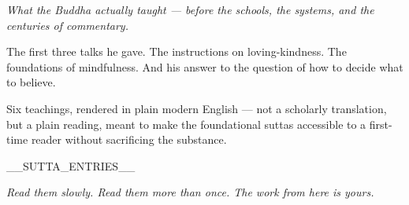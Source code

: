 \documentclass[__FONTSIZE__]{article}
\newcommand{\dividerrule}{\par\vspace{0.85em}{\color{saffron}\rule{3.2em}{1.1pt}}\par\vspace{0.85em}}
\newcommand{\suttaentry}[2]{%
  {\large\bfseries #1}\par
  \vspace{0.1em}
  {\itshape\color{muted}#2}\par
  \vspace{0.42em}%
}
\begin{document}
\raggedright
\sloppy
{}

{\large\itshape\color{muted}%
What the Buddha actually taught — before the schools, the systems, and the centuries of commentary.\par}

\vspace{1.4em}

The first three talks he gave. The instructions on loving-kindness. The foundations of mindfulness. And his answer to the question of how to decide what to believe.

\vspace{0.6em}

Six teachings, rendered in plain modern English — not a scholarly translation, but a plain reading, meant to make the foundational suttas accessible to a first-time reader without sacrificing the substance.

\dividerrule

__SUTTA_ENTRIES__

\dividerrule

{\itshape\color{muted}Read them slowly. Read them more than once. The work from here is yours.\par}

\end{document}
